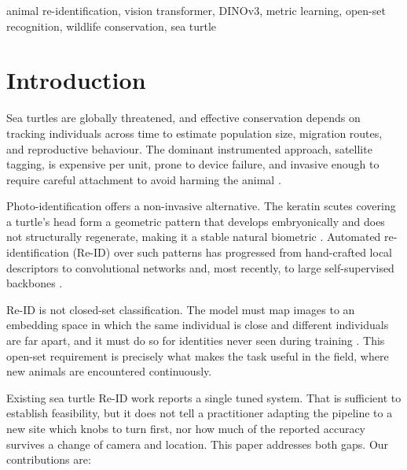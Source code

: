 \documentclass[conference]{IEEEtran}
\begin{document}
\begin{IEEEkeywords}
  animal re-identification, vision transformer, DINOv3, metric learning, open-set
  recognition, wildlife conservation, sea turtle
\end{IEEEkeywords}

\section{Introduction}

Sea turtles are globally threatened, and effective conservation depends on tracking
individuals across time to estimate population size, migration routes, and
reproductive behaviour. The dominant instrumented approach, satellite tagging, is
expensive per unit, prone to device failure, and invasive enough to require careful
attachment to avoid harming the animal \cite{hays2018}.

Photo-identification offers a non-invasive alternative. The keratin scutes covering a
turtle's head form a geometric pattern that develops embryonically and does not
structurally regenerate, making it a stable natural biometric \cite{carpentier2016}.
Automated re-identification (Re-ID) over such patterns has progressed from hand-crafted
local descriptors \cite{gatto2018,dunbar2023} to convolutional networks
\cite{nguyen2023} and, most recently, to large self-supervised backbones
\cite{cermak2024}.

Re-ID is not closed-set classification. The model must map images to an embedding
space in which the same individual is close and different individuals are far apart,
and it must do so for identities never seen during training \cite{zheng2015}. This
open-set requirement is precisely what makes the task useful in the field, where new
animals are encountered continuously.

Existing sea turtle Re-ID work reports a single tuned system. That is sufficient to
establish feasibility, but it does not tell a practitioner adapting the pipeline to a
new site which knobs to turn first, nor how much of the reported accuracy survives a
change of camera and location. This paper addresses both gaps. Our contributions are:
\end{document}
